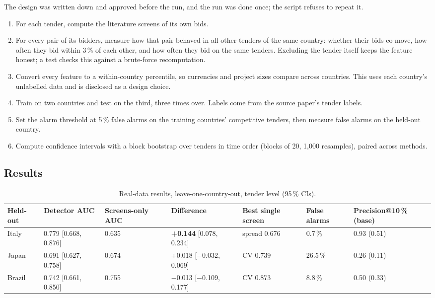 \documentclass[11pt,a4paper]{article}
\begin{document}
The design was written down and approved before the run, and the run was done once; the script refuses to repeat it.

\begin{enumerate}[leftmargin=2em]
\item For each tender, compute the literature screens of its own bids.
\item For every pair of its bidders, measure how that pair behaved in all other tenders of the same country: whether their bids co-move, how often they bid within 3\,\% of each other, and how often they bid on the same tenders. Excluding the tender itself keeps the feature honest; a test checks this against a brute-force recomputation.
\item Convert every feature to a within-country percentile, so currencies and project sizes compare across countries. This uses each country's unlabelled data and is disclosed as a design choice.
\item Train on two countries and test on the third, three times over. Labels come from the source paper's tender labels.
\item Set the alarm threshold at 5\,\% false alarms on the training countries' competitive tenders, then measure false alarms on the held-out country.
\item Compute confidence intervals with a block bootstrap over tenders in time order (blocks of 20, 1{,}000 resamples), paired across methods.
\end{enumerate}

\subsection{Results}

\begin{table}[H]
\centering
\small
\begin{tabular}{@{}lllllll@{}}
\toprule
Held-out & Detector AUC & Screens-only AUC & Difference & Best single screen & False alarms & Precision@10\,\% (base) \\
\midrule
Italy & 0.779 [0.668, 0.876] & 0.635 & \textbf{+0.144} [0.078, 0.234] & spread 0.676 & 0.7\,\% & 0.93 (0.51) \\
Japan & 0.691 [0.627, 0.758] & 0.674 & +0.018 [$-$0.032, 0.069] & CV 0.739 & 26.5\,\% & 0.26 (0.11) \\
Brazil & 0.742 [0.661, 0.850] & 0.755 & $-$0.013 [$-$0.109, 0.177] & CV 0.873 & 8.8\,\% & 0.50 (0.33) \\
\bottomrule
\end{tabular}
\caption{Real-data results, leave-one-country-out, tender level (95\,\% CIs).}
\end{table}
\end{document}
